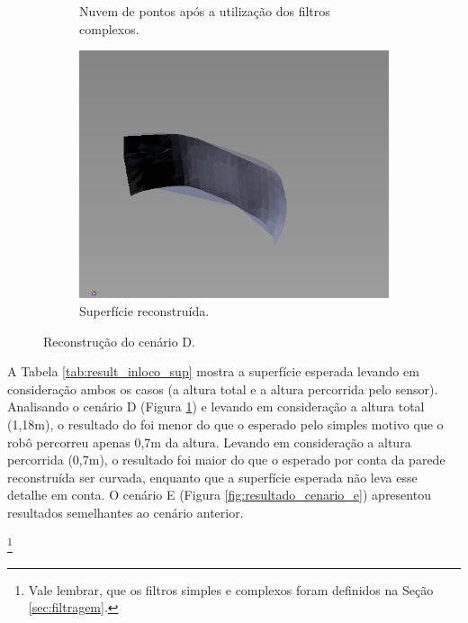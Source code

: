 \begin{figure}[H]
\begin{subfigure}[t]{0.327\textwidth}
        \caption{Nuvem de pontos após a utilização dos filtros complexos.}
    \end{subfigure}
    \begin{subfigure}[t]{0.327\textwidth}
        \includegraphics[width=\textwidth]{dados/figuras/perto_surface.png}
        \caption{Superfície reconstruída.}
    \end{subfigure}
    \caption{Reconstrução do cenário D.}
    \label{fig:resultado_cenario_d}
\end{figure}

A Tabela \ref{tab:result_inloco_sup} mostra a superfície esperada levando em consideração ambos os casos (a altura total e a altura percorrida pelo sensor).
Analisando o cenário D (Figura \ref{fig:resultado_cenario_d}) e levando em consideração a altura total (1,18m), o resultado do foi menor do que o esperado pelo simples motivo que o robô percorreu apenas 0,7m da altura.
Levando em consideração a altura percorrida (0,7m), o resultado foi maior do que o esperado por conta da parede reconstruída ser curvada, enquanto que a superfície esperada não leva esse detalhe em conta.
O cenário E (Figura \ref{fig:resultado_cenario_e}) apresentou resultados semelhantes ao cenário anterior.

\let\thefootnote\relax\footnote{Vale lembrar, que os filtros simples e complexos foram definidos na Seção \ref{sec:filtragem}.}

